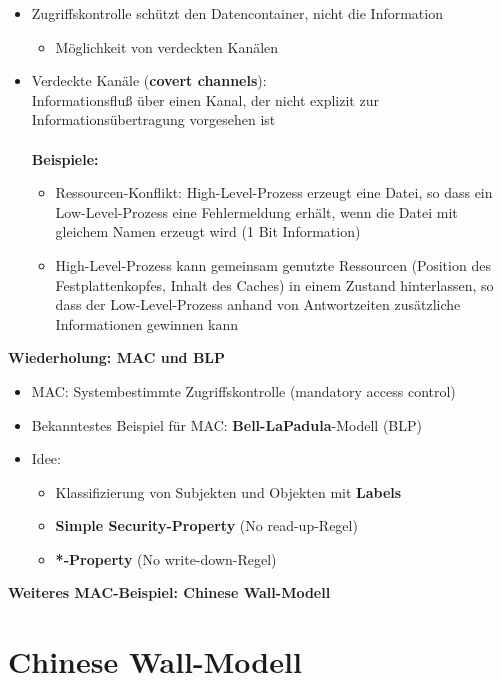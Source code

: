 \documentclass[openany]{book}
\begin{document}
\begin{itemize}
\item Zugriffskontrolle schützt den Datencontainer, nicht die Information
\begin{itemize}
\item Möglichkeit von verdeckten Kanälen
\end{itemize}
\item Verdeckte Kanäle (\textbf{covert channels}): \\ Informationsfluß über einen Kanal, der nicht explizit zur Informationsübertragung vorgesehen ist \\ \\ \textbf{Beispiele:}
\begin{itemize}
\item Ressourcen-Konflikt: High-Level-Prozess erzeugt eine Datei, so dass ein Low-Level-Prozess eine Fehlermeldung erhält, wenn die Datei mit gleichem Namen erzeugt wird (1 Bit Information)
\item High-Level-Prozess kann gemeinsam genutzte Ressourcen (Position des Festplattenkopfes, Inhalt des Caches) in einem Zustand hinterlassen, so dass der Low-Level-Prozess anhand von Antwortzeiten zusätzliche Informationen gewinnen kann 
\end{itemize}
\end{itemize}

\newpage

\textbf{Wiederholung: MAC und BLP}

\begin{itemize}
\item MAC: Systembestimmte Zugriffskontrolle (mandatory access control)
\item Bekanntestes Beispiel für MAC: \textbf{Bell-LaPadula}-Modell (BLP)
\item Idee:
\begin{itemize}
\item Klassifizierung von Subjekten und Objekten mit \textbf{Labels}
\item \textbf{Simple Security-Property} (No read-up-Regel)
\item \textbf{*-Property} (No write-down-Regel)
\end{itemize}
\end{itemize}

\textbf{Weiteres MAC-Beispiel: Chinese Wall-Modell}

\section{Chinese Wall-Modell}
\end{document}
